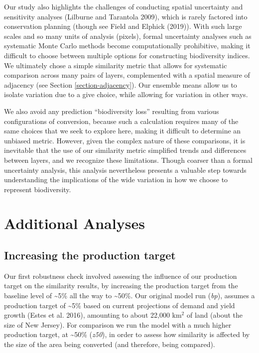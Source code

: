 \documentclass[
]{article}
\begin{document}
Our study also highlights the challenges of conducting spatial uncertainty and sensitivity analyses (Lilburne and Tarantola 2009), which is rarely factored into conservation planning (though see Field and Elphick (2019)). With such large scales and so many units of analysis (pixels), formal uncertainty analyses such as systematic Monte Carlo methods become computationally prohibitive, making it difficult to choose between multiple options for constructing biodiversity indices. We ultimately chose a simple similarity metric that allows for systematic comparison across many pairs of layers, complemented with a spatial measure of adjacency (see Section \ref{section-adjacency}). Our ensemble means allow us to isolate variation due to a give choice, while allowing for variation in other ways.

We also avoid any prediction ``biodiversity loss'' resulting from various configurations of conversion, because such a calculation requires many of the same choices that we seek to explore here, making it difficult to determine an unbiased metric. However, given the complex nature of these comparisons, it is inevitable that the use of our similarity metric simplified trends and differences between layers, and we recognize these limitations. Though coarser than a formal uncertainty analysis, this analysis nevertheless presents a valuable step towards understanding the implications of the wide variation in how we choose to represent biodiversity.

\hypertarget{robust}{%
\section{Additional Analyses}\label{robust}}

\hypertarget{section-prod-targ}{%
\subsection{Increasing the production target}\label{section-prod-targ}}

Our first robustness check involved assessing the influence of our production target on the similarity results, by increasing the production target from the baseline level of \textasciitilde5\% all the way to \textasciitilde50\%. Our original model run (\emph{bp}), assumes a production target of \textasciitilde5\% based on current projections of demand and yield growth (Estes et al. 2016), amounting to about 22,000 km\(^2\) of land (about the size of New Jersey). For comparison we run the model with a much higher production target, at \textasciitilde50\% (\emph{z50}), in order to assess how similarity is affected by the size of the area being converted (and therefore, being compared).
\end{document}
